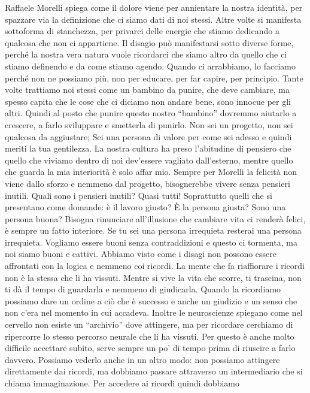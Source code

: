 \documentclass[12pt]{book} %
\begin{document}
Raffaele Morelli spiega come il dolore viene per annientare la nostra identità, per spazzare via la definizione che ci
siamo dati di noi stessi. Altre volte si manifesta sottoforma di stanchezza, per privarci delle energie che stiamo
dedicando a qualcosa che non ci appartiene. Il disagio può manifestarsi sotto diverse forme, perché la nostra vera
natura vuole ricordarci che siamo altro da quello che ci stiamo definendo e da come stiamo agendo. Quando ci
arrabbiamo, lo facciamo perché non ne possiamo più, non per educare, per far capire, per principio. Tante volte
trattiamo noi stessi come un bambino da punire, che deve cambiare, ma spesso capita che le cose che ci diciamo non
andare bene, sono innocue per gli altri. Quindi al posto che punire questo nostro “bambino” dovremmo aiutarlo a
crescere, a farlo sviluppare e smetterla di punirlo. Non sei un progetto, non sei qualcosa da aggiustare; Sei una
persona di valore per come sei adesso e quindi meriti la tua gentilezza. La nostra cultura ha preso l'abitudine di
pensiero che quello che viviamo dentro di noi dev'essere vagliato dall'esterno, mentre quello che
guarda la mia interiorità è solo affar mio. Sempre per Morelli la felicità non viene dallo sforzo e nemmeno dal
progetto, bisognerebbe vivere senza pensieri inutili. Quali sono i pensieri inutili? Quasi tutti! Soprattutto quelli
che si presentano come domande: è il lavoro giusto? È la persona giusta? Sono una persona
buona? Bisogna rinunciare all'illusione che cambiare vita ci
renderà felici, è sempre un fatto interiore. Se tu sei una persona irrequieta resterai una persona irrequieta. Vogliamo
essere buoni senza contraddizioni e questo ci tormenta, ma noi siamo buoni e cattivi. Abbiamo visto come i disagi non
possono essere affrontati con la logica e nemmeno coi ricordi. La mente che fa riaffiorare i ricordi non è la stessa
che li ha vissuti. Mentre si vive la vita che scorre, ti trascina, non ti dà il tempo di guardarla e nemmeno di
giudicarla. Quando la ricordiamo possiamo dare un ordine a ciò che è successo e anche un giudizio e un senso che non
c'era nel momento in cui accadeva. Inoltre le neuroscienze spiegano come nel cervello non esiste
un “archivio” dove attingere, ma per ricordare cerchiamo di ripercorre lo stesso percorso neurale che li ha vissuti.
Per questo è anche molto difficile accettare subito, serve sempre un po' di tempo prima di
riuscire a farlo davvero. Possiamo vederlo anche in un altro modo: non possiamo attingere direttamente dai ricordi, ma
dobbiamo passare attraverso un intermediario che si chiama immaginazione. Per accedere ai ricordi quindi dobbiamo
\end{document}
